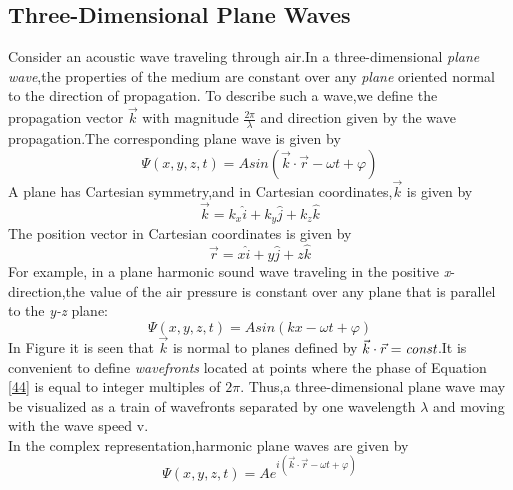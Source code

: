 \documentclass[12pt]{article}
\numberwithin{equation}{section}
\begin{document}
\subsection{Three-Dimensional Plane Waves}
Consider an acoustic wave traveling through air.In a three-dimensional \emph{plane wave},the
properties of the medium are constant over any \emph{plane} oriented normal to the direction of propagation.
To describe such a wave,we define the propagation vector $\vec{k}$ with magnitude $\frac{2\pi}{\lambda}$ and direction given by the wave propagation.The corresponding plane wave is given by
\begin{equation}
    \Psi(x,y,z,t)=Asin(\vec{k}\cdot \vec{r}-\omega t+\varphi)\label{44}
\end{equation}
A plane has Cartesian symmetry,and in Cartesian coordinates,$\vec{k}$ is given by
\begin{equation}
    \vec{k}=k_x\hat{i}+k_y\hat{j}+k_z\hat{k}\label{45}
\end{equation}
The position vector in Cartesian coordinates is given by 
\begin{equation}
    \vec{r}=x\hat{i}+y\hat{j}+z\hat{k}\label{46}    
\end{equation}
For example, in a plane harmonic sound wave traveling in the positive \emph{x}-direction,the value of the air pressure is constant over any plane that is parallel to the \emph{y-z} plane:
\begin{equation}
    \Psi(x,y,z,t)=Asin(kx-\omega t+\varphi)\label{47}
\end{equation}
\indent In Figure it is seen that $\vec{k}$ is normal to planes defined by $\vec{k}\cdot\vec{r}=\emph{const}$.It is convenient to 
define \emph{wavefronts} located at points where the phase of Equation \eqref{44} is equal to integer multiples of $2\pi$.
Thus,a three-dimensional plane wave may be visualized as a train of wavefronts separated by one wavelength $\lambda$ and moving with the wave speed v.\\
\indent In the complex representation,harmonic plane waves are given by
\begin{equation}
    \Psi(x,y,z,t)=Ae^{i(\vec{k}\cdot\vec{r}-\omega t+\varphi)}\label{48}
\end{equation}
\end{document}
